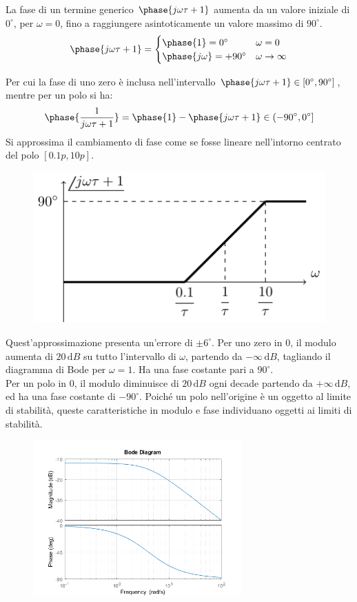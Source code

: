 \documentclass{article}
\numberwithin{equation}{subsection}
\newcommand{\df}{\mathrm{d}}
\begin{document}
La fase di un termine generico $\phase{j\omega\tau+1}$ aumenta da un valore iniziale di $0^{\circ}$, per $\omega=0$, fino a raggiungere asintoticamente un valore massimo di $90^{\circ}$. 
\begin{gather}
    \phase{j\omega\tau+1}=\begin{cases}
        \phase{1}=0^{\circ}&\omega=0\\
        \phase{j\omega}=+90^{\circ}&\omega\to\infty
    \end{cases}
\end{gather}

Per cui la fase di uno zero è inclusa nell'intervallo $\phase{j\omega\tau+1}\in[0^{\circ},90^{\circ}]$, mentre per un polo si ha:
\begin{equation*}
    \phase{\displaystyle\frac{1}{j\omega\tau+1}}=\phase{1}-\phase{j\omega\tau+1}\in(-90^{\circ},0^{\circ}]
\end{equation*}
Si approssima il cambiamento di fase come se fosse lineare nell'intorno centrato del polo $[0.1p,10 p]$. 
\begin{figure}[H]%
    \centering
    \includegraphics{fase-bode-1.pdf}%
\end{figure}
Quest'approssimazione presenta un'errore di $\pm6^{\circ}$. 
Per uno zero in $0$, il modulo aumenta di $20\,\df B$ su tutto l'intervallo di $\omega$, partendo da $-\infty\, \df B$, tagliando il diagramma di Bode per $\omega=1$. 
Ha una fase costante pari a $90^{\circ}$.
\\
Per un polo in $0$, il modulo diminuisce di $20\,\df B$ ogni decade partendo da $+\infty\,\df B$, ed ha una fase costante di $-90^{\circ}$. Poiché un polo nell'origine 
è un oggetto al limite di stabilità, queste caratteristiche in modulo e fase individuano oggetti ai limiti di stabilità. 
\begin{figure}[H]%
    \centering
    \includegraphics[width=8cm]{Bode1Polo}%
\end{figure}
\end{document}
